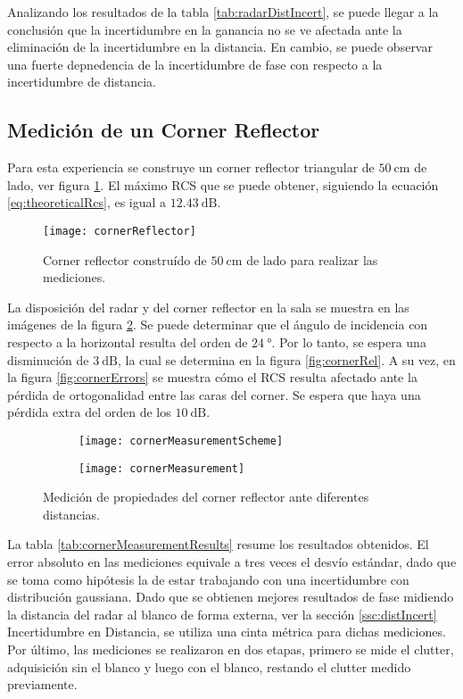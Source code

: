 Analizando los resultados de la tabla \ref{tab:radarDistIncert}, se puede llegar a la conclusión que la incertidumbre en la ganancia no se ve afectada ante la eliminación de la incertidumbre en la distancia. En cambio, se puede observar una fuerte depnedencia de la incertidumbre de fase con respecto a la incertidumbre de distancia.


\subsection{Medición de un Corner Reflector}

Para esta experiencia se construye un corner reflector triangular de $\SI{50}{\centi\meter}$ de lado, ver figura \ref{fig:corner}. El máximo RCS que se puede obtener, siguiendo la ecuación \ref{eq:theoreticalRcs}, es igual a $\SI{12.43}{\dB}$.
\begin{figure}[htb]
  \centering
  \texttt{[image: cornerReflector]}
  \caption{Corner reflector construído de $\SI{50}{\centi\meter}$ de lado para realizar las mediciones.}
  \label{fig:corner}
\end{figure}

La disposición del radar y del corner reflector en la sala se muestra en las imágenes de la  figura \ref{fig:cornerMeasurement}. Se puede determinar que el ángulo de incidencia con respecto a la horizontal resulta del orden de $\SI{24}{\degree}$. Por lo tanto, se espera una disminución de $\SI{3}{\dB}$, la cual se determina en la figura \ref{fig:cornerRel}. A su vez, en la figura \ref{fig:cornerErrors} se muestra cómo el RCS resulta afectado ante la pérdida de ortogonalidad entre las caras del corner. Se espera que haya una pérdida extra del orden de los $\SI{10}{\dB}$.
\begin{figure}[htb]
  \centering
  \begin{subfigure}{0.54\textwidth}
    \texttt{[image: cornerMeasurementScheme]}
  \end{subfigure}
  \begin{subfigure}{0.44\textwidth}
    \texttt{[image: cornerMeasurement]}
  \end{subfigure}
  \caption{Medición de propiedades del corner reflector ante diferentes distancias.}
  \label{fig:cornerMeasurement}
\end{figure}
La tabla \ref{tab:cornerMeasurementResults} resume los resultados obtenidos. El error absoluto en las mediciones equivale a tres veces el desvío estándar, dado que se toma como hipótesis la de estar trabajando con una incertidumbre con distribución gaussiana. Dado que se obtienen mejores resultados de fase midiendo la distancia del radar al blanco de forma externa, ver la sección \ref{ssc:distIncert} Incertidumbre en Distancia, se utiliza una cinta métrica para dichas mediciones. Por último, las mediciones se realizaron en dos etapas, primero se mide el clutter, adquisición sin el blanco y luego con el blanco, restando el clutter medido previamente.

